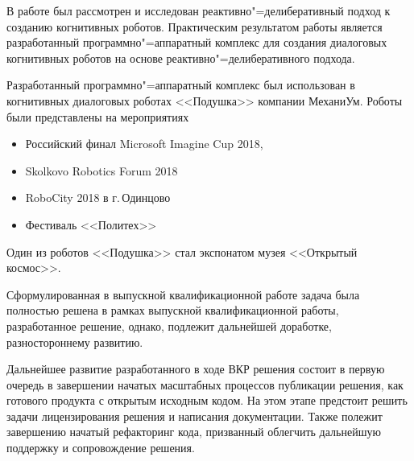 
В работе был рассмотрен и исследован реактивно"=делиберативный подход к созданию когнитивных роботов. Практическим результатом работы является разработанный программно"=аппаратный комплекс для создания диалоговых когнитивных роботов на основе реактивно"=делиберативного подхода. 

Разработанный программно"=аппаратный комплекс был использован в когнитивных диалоговых роботах <<Подушка>> компании МеханиУм. Роботы были представлены на мероприятиях 

\begin{itemize}
    \item Российский финал Microsoft Imagine Cup 2018,
    \item Skolkovo Robotics Forum 2018
    \item RoboCity 2018 в г.\,Одинцово
    \item Фестиваль <<Политех>>
\end{itemize}

Один из роботов <<Подушка>> стал экспонатом музея <<Открытый космос>>. 


Сформулированная в выпускной квалификационной работе задача была полностью решена в рамках выпускной квалификационной работы, разработанное решение, однако, подлежит дальнейшей доработке, разностороннему развитию. 


Дальнейшее развитие разработанного в ходе ВКР решения состоит в первую очередь в завершении начатых масштабных процессов публикации решения, как готового продукта с открытым исходным кодом. На этом этапе предстоит решить задачи лицензирования решения и написания документации. 
Также полежит завершению начатый рефакторинг кода, призванный облегчить дальнейшую поддержку и сопровождение решения.

